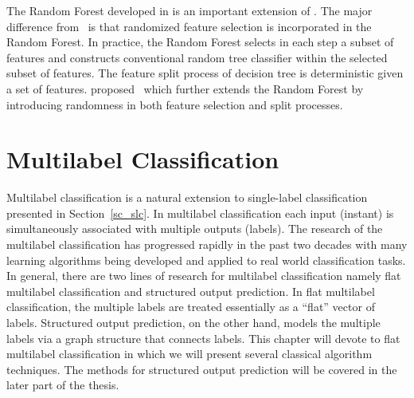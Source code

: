 {The Random Forest developed in \citep{Breiman01random} is an important extension of \bagging.
The major difference from \bagging\ is that randomized feature selection is incorporated in the Random Forest.
In practice, the Random Forest selects in each step a subset of features and constructs conventional random tree classifier within the selected subset of features.
The feature split process of decision tree is deterministic given a set of features.
\citet{Liu08spectrum} proposed \vrtree\ which further extends the Random Forest by introducing randomness in both feature selection and split processes.





%
%
\chapter{Multilabel Classification} \label{ch_fmlc}

Multilabel classification is a natural extension to single-label classification presented in Section~\ref{sc_slc}.
In multilabel classification each input (instant) is simultaneously associated with multiple outputs (labels).
The research of the multilabel classification has progressed rapidly in the past two decades with many learning algorithms being developed and applied to real world classification tasks.
In general, there are two lines of research for multilabel classification namely flat multilabel classification and structured output prediction.
In flat multilabel classification, the multiple labels are treated essentially as a ``flat'' vector of labels.
Structured output prediction, on the other hand, models the multiple labels via a graph structure that connects labels.
This chapter will devote to flat multilabel classification in which we will present several classical algorithm techniques.
The methods for structured output prediction will be covered in the later part of the thesis.

}
